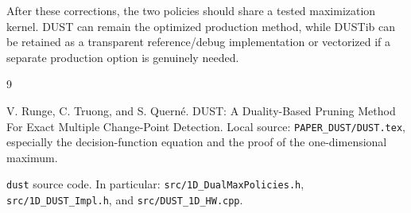 \documentclass[11pt]{article}
\begin{document}
After these corrections, the two policies should share a tested maximization
kernel.  DUST can remain the optimized production method, while DUSTib can be
retained as a transparent reference/debug implementation or vectorized if a
separate production option is genuinely needed.

\begin{thebibliography}{9}

V. Runge, C. Truong, and S. Quern\'{e}.
\newblock DUST: A Duality-Based Pruning Method For Exact Multiple Change-Point Detection.
\newblock Local source: \texttt{PAPER\_DUST/DUST.tex}, especially the
decision-function equation and the proof of the one-dimensional maximum.

\texttt{dust} source code.
\newblock In particular: \texttt{src/1D\_DualMaxPolicies.h},
\texttt{src/1D\_DUST\_Impl.h}, and \texttt{src/DUST\_1D\_HW.cpp}.

\end{thebibliography}
\end{document}
